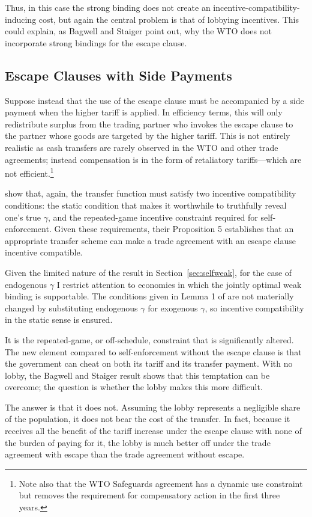 \documentclass[12pt,titlepage]{article}
\newcommand{\ga}{\gamma}
\begin{document}
Thus, in this case the strong binding does not create an incentive-compatibility-inducing cost, but again the central problem is that of lobbying incentives. This could explain, as Bagwell and Staiger point out, why the WTO does not incorporate strong bindings for the escape clause.

\subsection{Escape Clauses with Side Payments}
Suppose instead that the use of the escape clause must be accompanied by a side payment when the higher tariff is applied. In efficiency terms, this will only redistribute surplus from the trading partner who invokes the escape clause to the partner whose goods are targeted by the higher tariff. This is not entirely realistic as cash transfers are rarely observed in the WTO and other trade agreements; instead compensation is in the form of retaliatory tariffs---which are not efficient.\footnote{Note also that the WTO Safeguards agreement has a dynamic use constraint but removes the requirement for compensatory action in the first three years.}

\Textcite{bs2005} show that, again, the transfer function must satisfy two incentive compatibility conditions: the static condition that makes it worthwhile to truthfully reveal one's true $\ga$, and the repeated-game incentive constraint required for self-enforcement. Given these requirements, their Proposition 5 establishes that an appropriate transfer scheme can make a trade agreement with an escape clause incentive compatible.

Given the limited nature of the result in Section~\ref{sec:selfweak}, for the case of endogenous $\ga$ I restrict attention to economies in which the jointly optimal weak binding is supportable. The conditions given in Lemma 1 of \Textcite{bs2005} are not materially changed by substituting endogenous $\ga$ for exogenous $\ga$, so incentive compatibility in the static sense is ensured.

It is the repeated-game, or off-schedule, constraint that is significantly altered. The new element compared to self-enforcement without the escape clause is that the government can cheat on both its tariff and its transfer payment. With no lobby, the Bagwell and Staiger result shows that this temptation can be overcome; the question is whether the lobby makes this more difficult.

The answer is that it does not. Assuming the lobby represents a negligible share of the population, it does not bear the cost of the transfer. In fact, because it receives all the benefit of the tariff increase under the escape clause with none of the burden of paying for it, the lobby is much better off under the trade agreement with escape than the trade agreement without escape.
\end{document}
